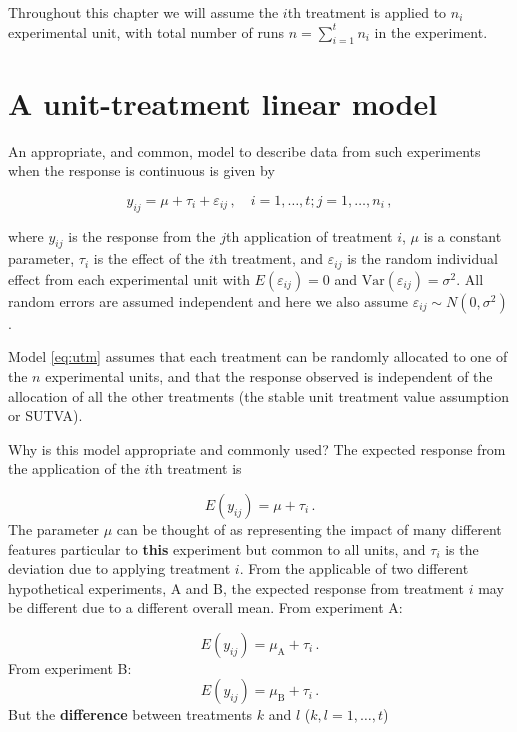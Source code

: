 \documentclass[
]{book}
\theoremstyle{definition}
\theoremstyle{definition}
\theoremstyle{definition}
\theoremstyle{definition}
\theoremstyle{remark}
\begin{document}
Throughout this chapter we will assume the \(i\)th treatment is applied to \(n_i\) experimental unit, with total number of runs \(n = \sum_{i=1}^t n_i\) in the experiment.

\hypertarget{a-unit-treatment-linear-model}{%
\section{A unit-treatment linear model}\label{a-unit-treatment-linear-model}}

An appropriate, and common, model to describe data from such experiments when the response is continuous is given by

\begin{equation}
y_{ij} = \mu + \tau_i + \varepsilon_{ij}\,, \quad i = 1, \ldots, t; j = 1, \ldots, n_i\,, 
\label{eq:utm}
\end{equation}

where \(y_{ij}\) is the response from the \(j\)th application of treatment \(i\), \(\mu\) is a constant parameter, \(\tau_i\) is the effect of the \(i\)th treatment, and \(\varepsilon_{ij}\) is the random individual effect from each experimental unit with \(E(\varepsilon_{ij})=0\) and \(\mathrm{Var}(\varepsilon_{ij}) = \sigma^2\). All random errors are assumed independent and here we also assume \(\varepsilon_{ij} \sim N(0, \sigma^2)\).

Model \eqref{eq:utm} assumes that each treatment can be randomly allocated to one of the \(n\) experimental units, and that the response observed is independent of the allocation of all the other treatments (the stable unit treatment value assumption or SUTVA).

Why is this model appropriate and commonly used? The expected response from the application of the \(i\)th treatment is

\[
E(y_{ij}) = \mu + \tau_i\,.
\]
The parameter \(\mu\) can be thought of as representing the impact of many different features particular to \textbf{this} experiment but common to all units, and \(\tau_i\) is the deviation due to applying treatment \(i\). From the applicable of two different hypothetical experiments, A and B, the expected response from treatment \(i\) may be different due to a different overall mean. From experiment A:

\[
E(y_{ij}) = \mu_{\mathrm{A}} + \tau_i\,.
\]
From experiment B:
\[
E(y_{ij}) = \mu_{\mathrm{B}} + \tau_i\,.
\]
But the \textbf{difference} between treatments \(k\) and \(l\) (\(k, l = 1,\ldots, t\))
\end{document}
